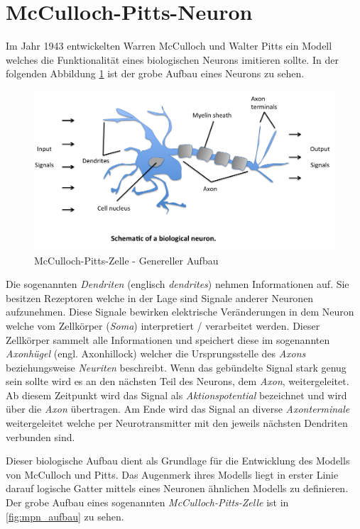 \section{McCulloch-Pitts-Neuron}

Im Jahr 1943 entwickelten Warren McCulloch und Walter Pitts ein Modell welches die Funktionalität eines biologischen Neurons imitieren sollte. In der folgenden Abbildung \ref{fig:bioNeuron} ist der grobe Aufbau eines Neurons zu sehen. 

\begin{figure}[!htb]
	\centering
	\includegraphics[width=\linewidth]{img/bioNeuron}
	\caption{McCulloch-Pitts-Zelle - Genereller Aufbau \cite{mpNeuron} \cite{perceptronAdeline}}
	\label{fig:bioNeuron}
\end{figure}

Die sogenannten \emph{Dendriten} (englisch \emph{dendrites}) nehmen Informationen auf. Sie besitzen Rezeptoren welche in der Lage sind Signale anderer Neuronen aufzunehmen. Diese Signale bewirken elektrische Veränderungen in dem Neuron welche vom Zellkörper (\emph{Soma}) interpretiert / verarbeitet werden. Dieser Zellkörper sammelt alle Informationen und speichert diese im sogenannten \emph{Axonhügel} (engl. Axonhillock) welcher die Ursprungsstelle des \emph{Axons} beziehungsweise \emph{Neuriten} beschreibt. Wenn das gebündelte Signal stark genug sein sollte wird es an den nächsten Teil des Neurons, dem \emph{Axon}, weitergeleitet. Ab diesem Zeitpunkt wird das Signal als \emph{Aktionspotential} bezeichnet und wird über die \emph{Axon} übertragen. Am Ende wird das Signal an diverse \emph{Axonterminale} weitergeleitet welche per Neurotransmitter mit den jeweils nächsten Dendriten verbunden sind. 

Dieser biologische Aufbau dient als Grundlage für die Entwicklung des Modells von McCulloch und Pitts. Das Augenmerk ihres Modells liegt in erster Linie darauf logische Gatter mittels eines Neuronen ähnlichen Modells zu definieren. Der grobe Aufbau eines sogenannten \emph{McCulloch-Pitts-Zelle} ist in \ref{fig:mpn_aufbau} zu sehen. 


